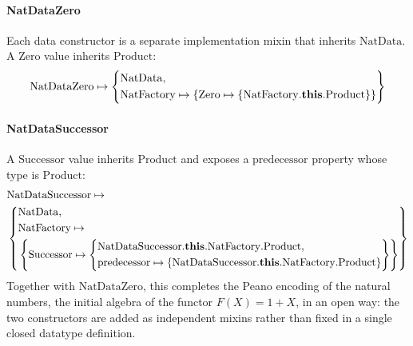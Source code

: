 \paragraph{NatDataZero}
Each data constructor is a separate implementation mixin that inherits
$\mathrm{NatData}$.
A $\mathrm{Zero}$ value inherits $\mathrm{Product}$:
\[
  \mathrm{NatDataZero} \mapsto \left\{
    \begin{aligned}
      &\mathrm{NatData},\\
      &\mathrm{NatFactory} \mapsto \{\mathrm{Zero} \mapsto \{\mathrm{NatFactory}.\mathbf{this}.\mathrm{Product}\}\}
  \end{aligned}\right\}
\]

\paragraph{NatDataSuccessor}
A $\mathrm{Successor}$ value inherits $\mathrm{Product}$ and
exposes a $\mathrm{predecessor}$ property whose type is $\mathrm{Product}$:
\[
  \begin{aligned}
    &\mathrm{NatDataSuccessor} \mapsto \\
    &\left\{
    \begin{aligned}
      &\mathrm{NatData},\\
      &\mathrm{NatFactory} \mapsto \\
      &\left\{\mathrm{Successor} \mapsto \left\{
        \begin{aligned}
          &\mathrm{NatDataSuccessor}.\mathbf{this}.\mathrm{NatFactory}.\mathrm{Product},\\
          &\mathrm{predecessor} \mapsto \{\mathrm{NatDataSuccessor}.\mathbf{this}.\mathrm{NatFactory}.\mathrm{Product}\}
      \end{aligned}\right\}\right\}
  \end{aligned}\right\}
  \end{aligned}
\]
Together with $\mathrm{NatDataZero}$, this completes the Peano encoding of
the natural numbers, the initial algebra of the functor $F(X) = 1 + X$,
in an open way: the two constructors are added as independent mixins
rather than fixed in a single closed datatype definition.

